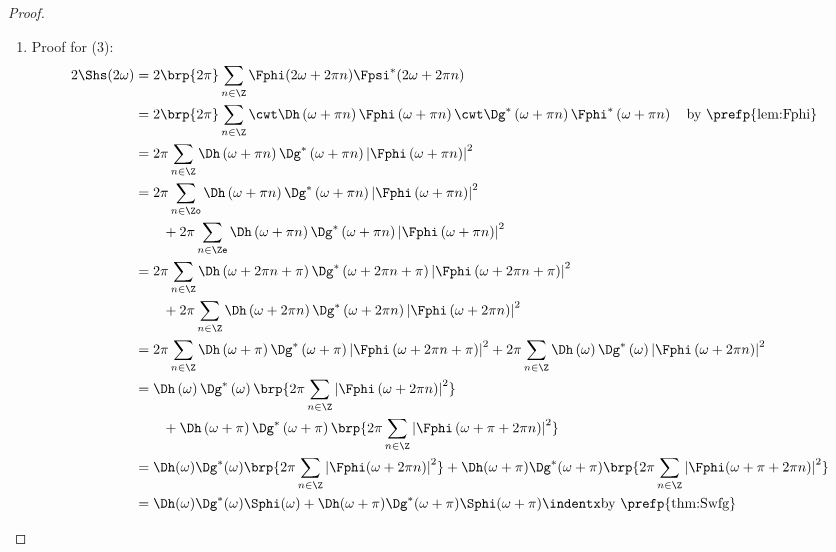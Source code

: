\begin{proof}
\begin{enumerate}
\item Proof for (3):
\begin{align*}
  2\Shs(2\omega)
    &=  2\brp{2\pi}\sum_{n\in\Z} \Fphi(2\omega+2\pi n) \Fpsi^\ast(2\omega+2\pi n)
  \\&=  2\brp{2\pi}\sum_{n\in\Z}
        \cwt 
        \Dh  \left(\omega +\pi n \right)
        \Fphi\left(\omega +\pi n \right)
        \cwt 
        \Dg^\ast  \left(\omega +\pi n \right)
        \Fphi^\ast\left(\omega +\pi n \right)
        \quad\text{by \prefp{lem:Fphi}}
  \\&=  2\pi
        \sum_{n\in\Z}
        \Dh  \left(\omega +\pi n \right)
        \Dg^\ast  \left(\omega +\pi n \right)
        \left| \Fphi\left(\omega +\pi n \right) \right|^2
  \\&=  2\pi
        \sum_{n\in\Zo}
        \Dh  \left(\omega +\pi n \right)
        \Dg^\ast  \left(\omega +\pi n \right)
        \left| \Fphi\left(\omega +\pi n \right) \right|^2
      \\&\qquad+ 2\pi\sum_{n\in\Ze}
        \Dh  \left(\omega +\pi n \right)
        \Dg^\ast  \left(\omega +\pi n \right)
        \left| \Fphi\left(\omega +\pi n \right) \right|^2
  \\&=  2\pi\sum_{n\in\Z}
        \Dh  \left(\omega +2\pi n+\pi \right)
        \Dg^\ast  \left(\omega +2\pi n+\pi \right)
        \left| \Fphi\left(\omega +2\pi n+\pi \right) \right|^2
      \\&\qquad+ 2\pi\sum_{n\in\Z}
        \Dh  \left(\omega +2\pi n\right)
        \Dg^\ast  \left(\omega +2\pi n\right)
        \left| \Fphi\left(\omega +2\pi n\right) \right|^2
  \\&=  2\pi
        \sum_{n\in\Z}
        \Dh  \left(\omega +\pi \right)
        \Dg^\ast  \left(\omega +\pi \right)
        \left| \Fphi\left(\omega +2\pi n+\pi \right) \right|^2
      + 2\pi\sum_{n\in\Z}
        \Dh  \left(\omega \right)
        \Dg^\ast  \left(\omega \right)
        \left| \Fphi\left(\omega +2\pi n\right) \right|^2
  \\&=  \Dh  \left(\omega \right)
        \Dg^\ast  \left(\omega \right)
        \brp{2\pi\sum_{n\in\Z} \left| \Fphi\left(\omega +2\pi n\right) \right|^2}
      \\&\qquad+ \Dh  \left(\omega +\pi \right)
        \Dg^\ast  \left(\omega +\pi \right)
        \brp{2\pi\sum_{n\in\Z}\left| \Fphi\left(\omega +\pi+2\pi n\right) \right|^2}
  \\&=  \Dh(\omega)
        \Dg^\ast(\omega)
        \brp{2\pi\sum_{n\in\Z} \left| \Fphi(\omega +2\pi n) \right|^2}
      + \Dh  (\omega +\pi)
        \Dg^\ast (\omega +\pi)
        \brp{2\pi\sum_{n\in\Z}\left| \Fphi(\omega +\pi+2\pi n) \right|^2}
  \\&=  \Dh(\omega     ) \Dg^\ast(\omega     )\Sphi(\omega)
      + \Dh(\omega +\pi) \Dg^\ast(\omega +\pi)\Sphi(\omega+\pi)
        \indentx\text{by \prefp{thm:Swfg}}
\end{align*}

\end{enumerate}
\end{proof}

